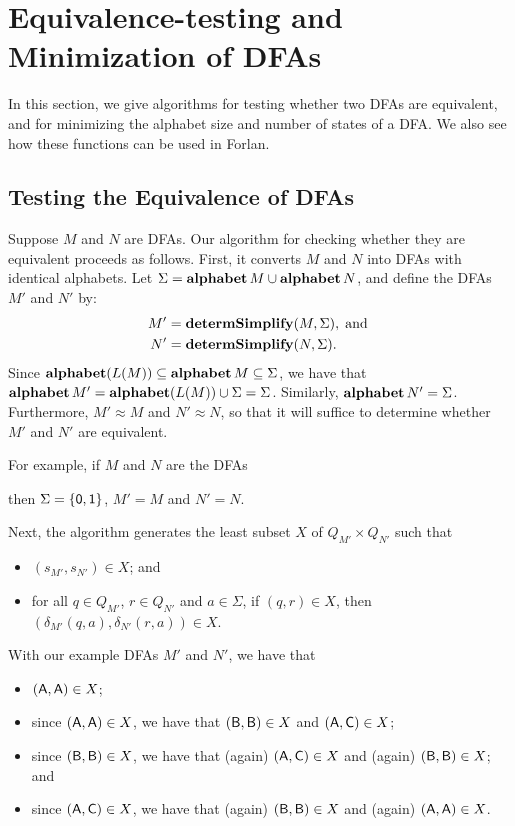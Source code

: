 \section{Equivalence-testing and Minimization of DFAs}
\label{EquivalenceTestingAndMinimizationOfDFAs}

In this section, we give algorithms for testing whether two DFAs are
equivalent, and for minimizing the alphabet size and number of states
of a DFA.  We also see how these functions can be used in Forlan.

\subsection{Testing the Equivalence of DFAs}

%

Suppose $M$ and $N$ are DFAs.  Our algorithm for checking whether they
are equivalent proceeds as follows.  First, it converts $M$ and $N$
into DFAs with identical alphabets.  Let
$\Sigma=\mathbf{alphabet}\,M\cup\mathbf{alphabet}\,N$, and define the DFAs $M'$ and
$N'$ by:
\begin{align*}
M' &= \mathbf{determSimplify}(M,\Sigma) , \;\allowbreak\mbox{and}\allowbreak\;\\
N' &= \mathbf{determSimplify}(N,\Sigma) .
\end{align*}
Since $\mathbf{alphabet}(L(M))\subseteq\mathbf{alphabet}\,M\subseteq\Sigma$, we have that
$\mathbf{alphabet}\,M'=\mathbf{alphabet}(L(M))\cup\Sigma=\Sigma$.  Similarly,
$\mathbf{alphabet}\,N'=\Sigma$.  Furthermore, $M'\approx M$ and $N'\approx N$,
so that it will suffice to determine whether $M'$ and $N'$ are
equivalent.

For example, if $M$ and $N$ are the DFAs
\begin{center}

\end{center}
then $\Sigma=\{\mathsf{0},\mathsf{1}\}$, $M'=M$ and $N'=N$.

Next, the algorithm generates the least subset $X$ of $Q_{M'}\times Q_{N'}$
such that
\begin{itemize}
\item $(s_{M'},s_{N'})\in X$; and

\item for all $q\in Q_{M'}$, $r\in Q_{N'}$ and $a\in\Sigma$,
if $(q,r)\in X$, then $(\delta_{M'}(q,a),\delta_{N'}(r,a))\in X$.
\end{itemize}
With our example DFAs $M'$ and $N'$, we have that
\begin{itemize}
\item $(\mathsf{A},\mathsf{A})\in X$;

\item since $(\mathsf{A},\mathsf{A})\in X$, we have that {$(\mathsf{B},\mathsf{B})\in X$ and
    $(\mathsf{A},\mathsf{C})\in X$;}

\item since $(\mathsf{B},\mathsf{B})\in X$, we have that (again) $(\mathsf{A},\mathsf{C})\in
  X$ and (again) $(\mathsf{B},\mathsf{B})\in X$; and

\item since $(\mathsf{A},\mathsf{C})\in X$, we have that (again) $(\mathsf{B},\mathsf{B})\in
  X$ and (again) $(\mathsf{A},\mathsf{A})\in X$.
\end{itemize}

